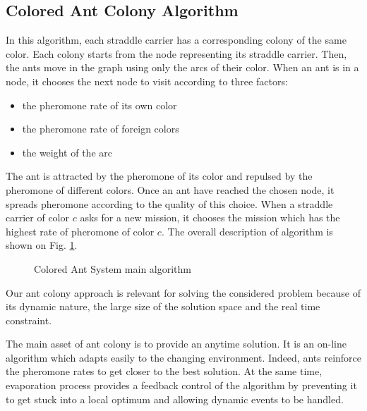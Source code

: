 \documentclass[journal]{IEEEtran}
\let\MYoriglatexcaption\caption
\renewcommand{\caption}[2][\relax]{\MYoriglatexcaption[#2]{#2}}
\begin{document}
\subsection{Colored Ant Colony Algorithm}
In this algorithm, each straddle carrier has a corresponding colony of the same color. Each colony starts from the node representing its straddle carrier. Then, the ants move in the graph using only the arcs of their color. When an ant is in a node, it chooses the next node to visit according to three factors:
\begin{itemize}
 \item the pheromone rate of its own color
 \item the pheromone rate of foreign colors
 \item the weight of the arc
\end{itemize}
The ant is attracted by the pheromone of its color and repulsed by the pheromone of different colors. Once an ant have reached the chosen node, it spreads pheromone according to the quality of this choice.
When a straddle carrier of color $c$ asks for a new mission, it chooses the mission which has the highest rate of pheromone of color $c$.
The overall description of algorithm is shown on Fig. \ref{algo}.
\begin{figure}[h]
	\caption{Colored Ant System main algorithm}
	\label{algo}
\end{figure}
	
Our ant colony approach is relevant for solving the considered problem
because of its dynamic nature, the large size of the solution space
and the real time constraint.

The main asset of ant colony is to provide an anytime solution. It is an on-line
algorithm which adapts easily to the changing environment. Indeed, ants reinforce the pheromone rates to get closer to the best solution. At the same time, evaporation process provides
a feedback control of the algorithm by preventing it to get stuck into a local
optimum and allowing dynamic events to be handled.\\
\end{document}
